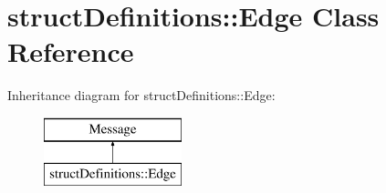\hypertarget{classstruct_definitions_1_1_edge}{}\section{struct\+Definitions\+:\+:Edge Class Reference}
\label{classstruct_definitions_1_1_edge}
Inheritance diagram for struct\+Definitions\+:\+:Edge\+:\begin{figure}[H]
\begin{center}
\leavevmode
\includegraphics[height=2.000000cm]{classstruct_definitions_1_1_edge}
\end{center}
\end{figure}
